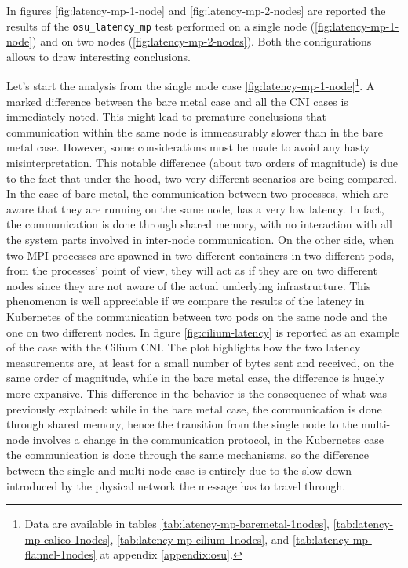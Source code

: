 In figures \ref{fig:latency-mp-1-node} and \ref{fig:latency-mp-2-nodes} are reported
the results of the \texttt{osu\_latency\_mp} test performed on a single node
(\ref{fig:latency-mp-1-node}) and on two nodes (\ref{fig:latency-mp-2-nodes}).
Both the configurations allows to draw interesting conclusions.

Let's start the analysis from the single node case
\ref{fig:latency-mp-1-node}\footnote{Data are available in tables
  \ref{tab:latency-mp-baremetal-1nodes}, \ref{tab:latency-mp-calico-1nodes},
  \ref{tab:latency-mp-cilium-1nodes}, and \ref{tab:latency-mp-flannel-1nodes} at
  appendix \ref{appendix:osu}.}.
A marked difference between the bare metal case and all the CNI cases is
immediately noted. This might lead to premature conclusions that communication
within the same node is immeasurably slower than in the bare metal case.
However, some considerations must be made to avoid any hasty misinterpretation.
This notable difference (about two orders of magnitude) is due to the fact that
under the hood, two very different scenarios are being compared.
In the case of bare metal, the communication between two processes, which are
aware that they are running on the same node, has a very low latency. In fact,
the communication is done through shared memory, with no interaction with all
the system parts involved in inter-node communication.
On the other side, when two MPI processes are spawned in two different
containers in two different pods, from the processes' point of view, they will
act as if they are on two different nodes since they are not aware of the actual
underlying infrastructure.
This phenomenon is well appreciable if we compare the results of the latency in
Kubernetes of the communication between two pods on the same node and the one on
two different nodes. In figure \ref{fig:cilium-latency} is reported as an
example of the case with the Cilium CNI.
The plot highlights how the two latency measurements are, at least for a small
number of bytes sent and received, on the same order of magnitude, while in the
bare metal case, the difference is hugely more expansive. This difference in the
behavior is the consequence of what was previously explained: while in the bare
metal case, the communication is done through shared memory, hence the
transition from the single node to the multi-node involves a change in the
communication protocol, in the Kubernetes case the communication is done through
the same mechanisms, so the difference between the single and multi-node case is
entirely due to the slow down introduced by the physical network the message has
to travel through.

